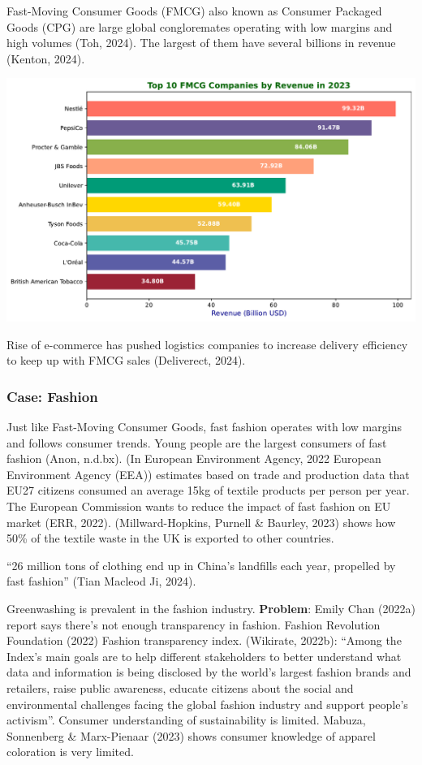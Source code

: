 \documentclass[
  letterpaper,
  DIV=11,
  numbers=noendperiod]{scrartcl}
\begin{document}
Fast-Moving Consumer Goods (FMCG) also known as Consumer Packaged Goods
(CPG) are large global congloremates operating with low margins and high
volumes (Toh, 2024). The largest of them have several billions in
revenue (Kenton, 2024).

\includegraphics{_thesis_files/figure-pdf/cell-24-output-1.pdf}

Rise of e-commerce has pushed logistics companies to increase delivery
efficiency to keep up with FMCG sales (Deliverect, 2024).

\subsubsection{Case: Fashion}\label{case-fashion}

Just like Fast-Moving Consumer Goods, fast fashion operates with low
margins and follows consumer trends. Young people are the largest
consumers of fast fashion (Anon, n.d.bx). (In European Environment
Agency, 2022 European Environment Agency (EEA)) estimates based on trade
and production data that EU27 citizens consumed an average 15kg of
textile products per person per year. The European Commission wants to
reduce the impact of fast fashion on EU market (ERR, 2022).
(Millward-Hopkins, Purnell \& Baurley, 2023) shows how 50\% of the
textile waste in the UK is exported to other countries.

``26 million tons of clothing end up in China's landfills each year,
propelled by fast fashion'' (Tian Macleod Ji, 2024).

Greenwashing is prevalent in the fashion industry. \textbf{Problem}:
Emily Chan (2022a) report says there's not enough transparency in
fashion. Fashion Revolution Foundation (2022) Fashion transparency
index. (Wikirate, 2022b): ``Among the Index's main goals are to help
different stakeholders to better understand what data and information is
being disclosed by the world's largest fashion brands and retailers,
raise public awareness, educate citizens about the social and
environmental challenges facing the global fashion industry and support
people's activism''. Consumer understanding of sustainability is
limited. Mabuza, Sonnenberg \& Marx-Pienaar (2023) shows consumer
knowledge of apparel coloration is very limited.
\end{document}

